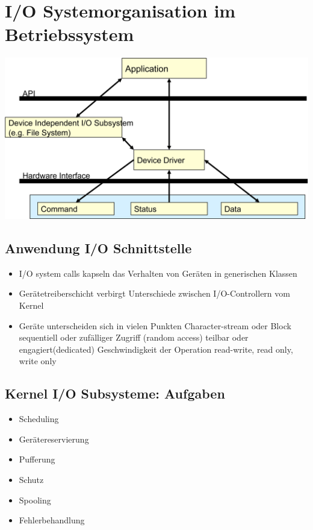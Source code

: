 \documentclass[a4paper]{scrreprt}
\begin{document}
\section{I/O Systemorganisation im Betriebssystem}
	\includegraphics[scale=0.24]{graphics/chapter9_7.png}
\subsection{Anwendung I/O Schnittstelle}
	\begin{itemize}
		\item I/O system calls kapseln das Verhalten von Geräten in generischen Klassen
		\item Gerätetreiberschicht verbirgt Unterschiede zwischen I/O-Controllern vom Kernel
		\item Geräte unterscheiden sich in vielen Punkten
			\subitem Character-stream oder Block
			\subitem sequentiell oder zufälliger Zugriff (random access)
			\subitem teilbar oder engagiert(dedicated)
			\subitem Geschwindigkeit der Operation	
			\subitem read-write, read only, write only
	\end{itemize}
\subsection{Kernel I/O Subsysteme: Aufgaben}
	\begin{itemize}
		\item Scheduling
		\item Gerätereservierung
		\item Pufferung
		\item Schutz
		\item Spooling
		\item Fehlerbehandlung
	\end{itemize}
\end{document}
